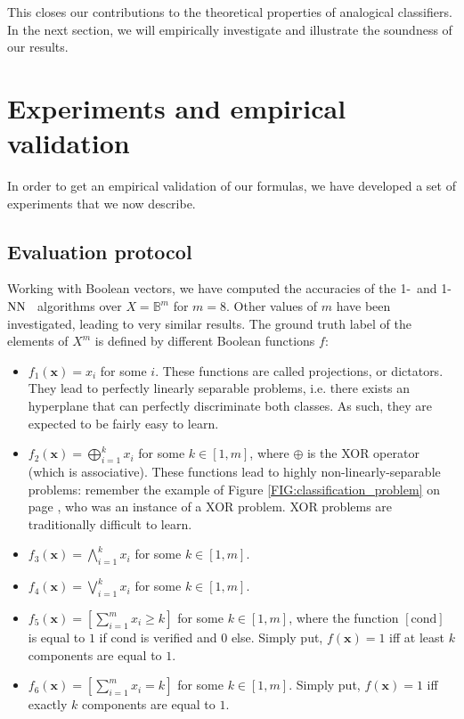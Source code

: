 This closes our contributions to the theoretical properties of analogical
classifiers. In the next section, we will empirically investigate and illustrate the
soundness of our results.

\section{Experiments and empirical validation}
\label{SEC:experiments_and_empirical_validation}
In order to get an empirical validation of our formulas, we have developed a
set of experiments that we now describe.

\subsection{Evaluation protocol}

Working with Boolean vectors, we have computed the accuracies of the 1-\NAN~and
1-$\text{NN}$~ algorithms over $X=\mathbb{B}^m$ for $m = 8$. Other values of $m$ have
been investigated, leading to very similar results.  The ground truth label of
the elements of $X^m$ is defined by different Boolean functions $f$:
\begin{itemize}
\item $f_1(\mathbf{x})=x_i$ for some $i$. These functions are called
  projections, or dictators.  They lead to perfectly linearly separable
    problems, i.e. there exists an hyperplane that can perfectly discriminate
    both classes. As such, they are expected to be fairly easy to learn.
  \item $f_2(\mathbf{x})= \bigoplus_{i = 1}^k  x_i$ for some $k \in[1, m]$, where $\oplus$
    is the XOR operator (which is associative). These functions
    lead to highly non-linearly-separable problems: remember the example of
    Figure \ref{FIG:classification_problem} on page
    \pageref{FIG:classification_problem}, who was an instance of a XOR problem.
    XOR problems are traditionally difficult to learn.
  \item $f_3(\mathbf{x})= \bigwedge_{i = 1}^k  x_i$ for some $k \in [1, m]$.
  \item $f_4(\mathbf{x})= \bigvee_{i = 1}^k  x_i$ for some $k\in [1, m]$.
  \item $f_5(\mathbf{x}) = \left[\sum_{i = 1}^m x_i \geq k\right]$ for some $k
    \in [1, m]$, where the function $[\text{cond}]$ is equal to $1$ if cond is
    verified and $0$ else. Simply put, $f(\mathbf{x}) = 1$ iff at least $k$
    components are equal to $1$.
  \item $f_6(\mathbf{x}) = \left[\sum_{i = 1}^m x_i = k\right]$ for some $k
    \in [1, m]$. Simply put, $f(\mathbf{x}) = 1$ iff exactly $k$ components
    are equal to $1$.
\end{itemize}


